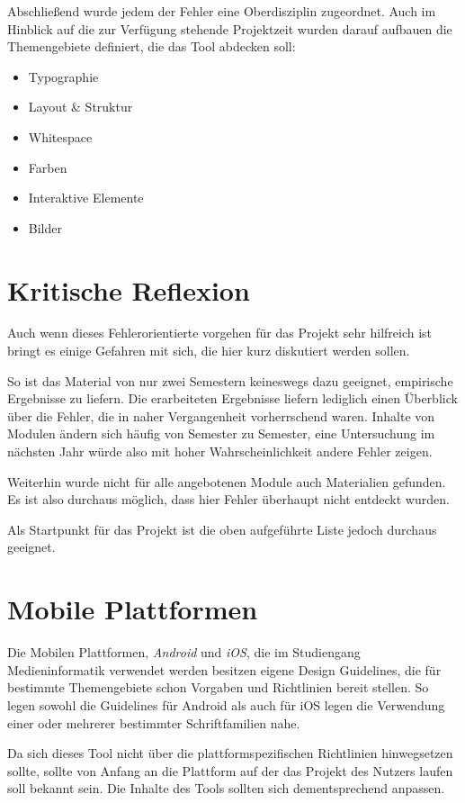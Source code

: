 Abschließend wurde jedem der Fehler eine Oberdisziplin zugeordnet. Auch im Hinblick auf die zur Verfügung stehende Projektzeit wurden darauf aufbauen die Themengebiete definiert, die das Tool abdecken soll:
\begin{itemize}
	\item Typographie
	\item Layout & Struktur
	\item Whitespace
	\item Farben
	\item Interaktive Elemente
	\item Bilder
\end{itemize}



\section{Kritische Reflexion}
Auch wenn dieses Fehlerorientierte vorgehen für das Projekt sehr hilfreich ist bringt es einige Gefahren mit sich, die hier kurz diskutiert werden sollen.

So ist das Material von nur zwei Semestern keineswegs dazu geeignet, empirische Ergebnisse zu liefern. Die erarbeiteten Ergebnisse liefern lediglich einen Überblick über die Fehler, die in naher Vergangenheit vorherrschend waren. Inhalte von Modulen ändern sich häufig von Semester zu Semester, eine Untersuchung im nächsten Jahr würde also mit hoher Wahrscheinlichkeit andere Fehler zeigen.

Weiterhin wurde nicht für alle angebotenen Module auch Materialien gefunden. Es ist also durchaus möglich, dass hier Fehler überhaupt nicht entdeckt wurden.

Als Startpunkt für das Projekt ist die oben aufgeführte Liste jedoch durchaus geeignet.



\section{Mobile Plattformen} \label{Mobile Plattformen}
Die Mobilen Plattformen, \textit{Android} und \textit{iOS}, die im Studiengang Medieninformatik verwendet werden besitzen eigene Design Guidelines, die für bestimmte Themengebiete schon Vorgaben und Richtlinien bereit stellen. So legen sowohl die Guidelines für Android als auch für iOS legen die Verwendung einer oder mehrerer bestimmter Schriftfamilien nahe.

Da sich dieses Tool nicht über die plattformspezifischen Richtlinien hinwegsetzen sollte, sollte von Anfang an die Plattform  auf der das Projekt des Nutzers laufen soll bekannt sein. Die Inhalte des Tools sollten sich dementsprechend anpassen.


\clearpage
